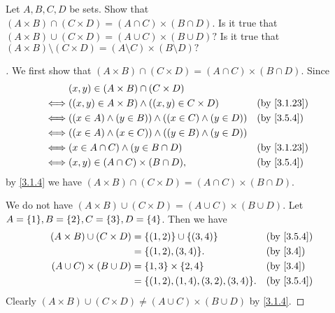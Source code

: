 \begin{ex}\label{ex:3.5.5}
	Let \(A, B, C, D\) be sets.
	Show that \((A \times B) \cap (C \times D) = (A \cap C) \times (B \cap D)\).
	Is it true that \((A \times B) \cup (C \times D) = (A \cup C) \times (B \cup D)?\)
	Is it true that \((A \times B) \setminus (C \times D) = (A \setminus C) \times (B \setminus D)?\)
\end{ex}

\begin{proof}[]
	We first show that \((A \times B) \cap (C \times D) = (A \cap C) \times (B \cap D)\).
	Since
	\begin{align*}
		     & (x, y) \in (A \times B) \cap (C \times D)                                      \\
		\iff & ((x, y) \in A \times B) \land ((x, y) \in C \times D)         &  & \by{3.1.23} \\
		\iff & ((x \in A) \land (y \in B)) \land ((x \in C) \land (y \in D)) &  & \by{3.5.4}  \\
		\iff & ((x \in A) \land (x \in C)) \land ((y \in B) \land (y \in D))                  \\
		\iff & (x \in A \cap C) \land (y \in B \cap D)                       &  & \by{3.1.23} \\
		\iff & (x, y) \in (A \cap C) \times (B \cap D),                      &  & \by{3.5.4}
	\end{align*}
	by \cref{3.1.4} we have \((A \times B) \cap (C \times D) = (A \cap C) \times (B \cap D)\).

	We do not have \((A \times B) \cup (C \times D) = (A \cup C) \times (B \cup D)\).
	Let \(A = \set{1}, B = \set{2}, C = \set{3}, D = \set{4}\).
	Then we have
	\begin{align*}
		(A \times B) \cup (C \times D) & = \set{(1, 2)} \cup \set{(3, 4)}        &  & \by{3.5.4} \\
		                               & = \set{(1, 2), (3, 4)}.                 &  & \by{3.4}   \\
		(A \cup C) \times (B \cup D)   & = \set{1, 3} \times \set{2, 4}          &  & \by{3.4}   \\
		                               & = \set{(1, 2), (1, 4), (3, 2), (3, 4)}. &  & \by{3.5.4}
	\end{align*}
	Clearly \((A \times B) \cup (C \times D) \neq (A \cup C) \times (B \cup D)\) by \cref{3.1.4}.


\end{proof}
